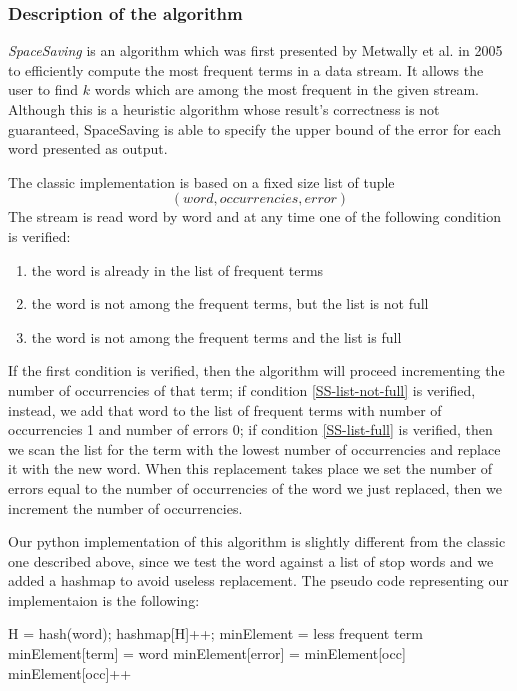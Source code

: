 \subsubsection*{Description of the algorithm}
\emph{SpaceSaving} \cite{SS} is an algorithm which was first presented by Metwally et al.
in 2005 to efficiently compute the most frequent terms in a data stream. It
allows the user to find $k$ words which are among the most frequent in the given
stream. Although this is a heuristic algorithm whose result's correctness is not
guaranteed, SpaceSaving is able to specify the upper bound of the error for each
word presented as output.

The classic implementation is based on a fixed size list of tuple 
\begin{displaymath}
	(word, occurrencies, error)
\end{displaymath}
The stream is read word by word and at any time one of the following condition
is verified:
\begin{enumerate}
	\item \label{SS-among-frequent}
		the word is already in the list of frequent terms
	\item \label{SS-list-not-full}
		the word is not among the frequent terms, but the list is not full
	\item \label{SS-list-full}
		the word is not among the frequent terms and the list is full
\end{enumerate}
If the first condition is verified, then the algorithm will proceed incrementing
the number of occurrencies of that term; if condition \ref{SS-list-not-full} is
verified, instead, we add that word to the list of frequent terms with number of
occurrencies 1 and number of errors 0; if condition \ref{SS-list-full} is
verified, then we scan the list for the term with the lowest number of
occurrencies and replace it with the new word. When this replacement takes place
we set the number of errors equal to the number of occurrencies of the word we
just replaced, then we increment the number of occurrencies.

Our python implementation of this algorithm is slightly different from the
classic one described above, since we test the word against a list of stop words
and we added a hashmap to avoid useless replacement. The pseudo code representing
our implementaion is the following:

\begin{algorithmic}
	\STATE H = hash(word);
	\STATE hashmap[H]++;
	    \STATE minElement = less frequent term
    	\STATE minElement[term] = word
    	\STATE minElement[error] = minElement[occ]
	    \STATE minElement[occ]++
	\ENDIF
	\ENDIF
\end{algorithmic}

